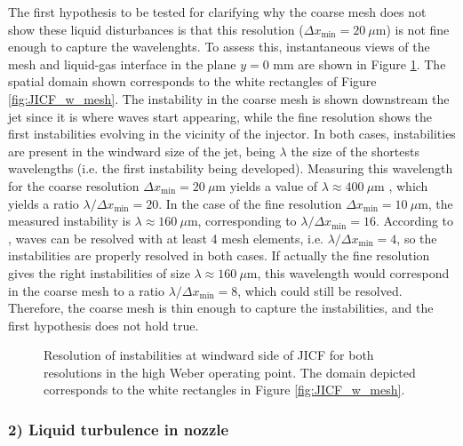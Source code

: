 The first hypothesis to be tested for clarifying why the coarse mesh does not show these liquid disturbances is that this resolution ($\Delta x_\mathrm{min} = 20~\mu$m) is not fine enough to capture the wavelenghts. To assess this, instantaneous views of the mesh and liquid-gas interface in the plane $y = 0$ mm are shown in Figure \ref{fig:JICF_instabilities_lambda}. The spatial domain shown corresponds to the white rectangles of Figure \ref{fig:JICF_w_mesh}. The instability in the coarse mesh is shown downstream the jet since it is where waves start appearing, while the fine resolution shows the first instabilities evolving in the vicinity of the injector. In both cases, instabilities are present in the windward size of the jet, being $\lambda$ the size of the shortests wavelengths (i.e. the first instability being developed). Measuring this wavelength for the coarse resolution $\Delta x_\mathrm{min} = 20~\mu$m yields a value of $\lambda \approx 400 ~ \mu$m , which yields a ratio $\lambda / \Delta x_\mathrm{min} = 20$. In the case of the fine resolution $\Delta x_\mathrm{min} = 10~\mu$m, the measured instability is $\lambda \approx 160 ~ \mu$m, corresponding to $\lambda / \Delta x_\mathrm{min} = 16$.  According to , waves can be resolved with at least 4 mesh elements, i.e.  $\lambda / \Delta x_\mathrm{min} = 4$, so the instabilities are properly resolved in both cases. If actually the fine resolution gives the right instabilities of size $\lambda \approx 160 ~ \mu$m, this wavelength would correspond in the coarse mesh to a ratio $\lambda / \Delta x_\mathrm{min} = 8$, which could still be resolved. Therefore, the coarse mesh is thin enough to capture the instabilities, and the first hypothesis does not hold true.



\begin{figure}[ht]
\centering
{}
\caption[Resolution of instabilities at windward side of JICF for both resolutions in the high Weber operating point.]{Resolution of instabilities at windward side of JICF for both resolutions in the high Weber operating point. The domain depicted corresponds to the white rectangles in Figure \ref{fig:JICF_w_mesh}. }
\label{fig:JICF_instabilities_lambda}
\end{figure}

\subsubsection*{2) Liquid turbulence in nozzle}

